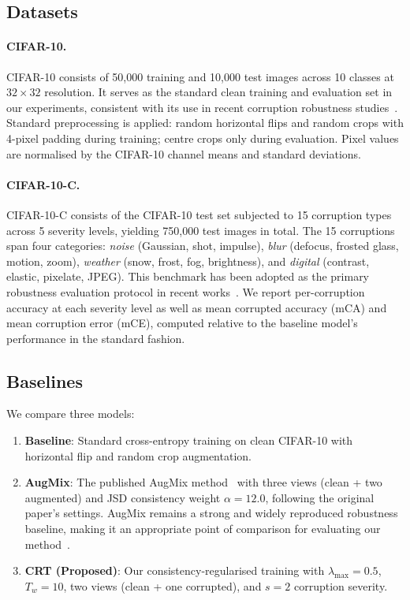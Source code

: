 \documentclass[10pt,twocolumn]{article}
\begin{document}
\subsection{Datasets}

\paragraph{CIFAR-10.} CIFAR-10 consists of 50,000 training and 10,000 test images across 10 classes at $32 \times 32$ resolution. It serves as the standard clean training and evaluation set in our experiments, consistent with its use in recent corruption robustness studies~\cite{erichson2024noisymix,ranabhat2025shapebias,kumar2026demhec}. Standard preprocessing is applied: random horizontal flips and random crops with 4-pixel padding during training; centre crops only during evaluation. Pixel values are normalised by the CIFAR-10 channel means and standard deviations.

\paragraph{CIFAR-10-C.} CIFAR-10-C consists of the CIFAR-10 test set subjected to 15 corruption types across 5 severity levels, yielding 750,000 test images in total. The 15 corruptions span four categories: \emph{noise} (Gaussian, shot, impulse), \emph{blur} (defocus, frosted glass, motion, zoom), \emph{weather} (snow, frost, fog, brightness), and \emph{digital} (contrast, elastic, pixelate, JPEG). This benchmark has been adopted as the primary robustness evaluation protocol in recent works~\cite{ranabhat2025shapebias,kumar2026demhec,khazem2026macs}. We report per-corruption accuracy at each severity level as well as mean corrupted accuracy (mCA) and mean corruption error (mCE), computed relative to the baseline model's performance in the standard fashion.

\subsection{Baselines}

We compare three models:
\begin{enumerate}[leftmargin=*, topsep=2pt, itemsep=1pt]
  \item \textbf{Baseline}: Standard cross-entropy training on clean CIFAR-10 with horizontal flip and random crop augmentation.
  \item \textbf{AugMix}: The published AugMix method~\cite{hendrycks2020augmix} with three views (clean + two augmented) and JSD consistency weight $\alpha = 12.0$, following the original paper's settings. AugMix remains a strong and widely reproduced robustness baseline, making it an appropriate point of comparison for evaluating our method~\cite{erichson2024noisymix,khazem2026macs}.
  \item \textbf{CRT (Proposed)}: Our consistency-regularised training with $\lambda_{\max} = 0.5$, $T_w = 10$, two views (clean + one corrupted), and $s = 2$ corruption severity.
\end{enumerate}
\end{document}
